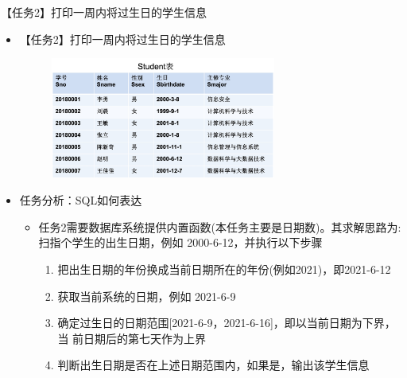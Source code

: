 \begin{frame}[allowframebreaks]{【任务2】打印一周内将过生日的学生信息}
\begin{itemize}
    \item 【任务2】打印一周内将过生日的学生信息
   \begin{figure}
        \centering
        \includegraphics[width=0.7\textwidth]{figure/fig-4.jpg}
    \end{figure}
\end{itemize}

\framebreak
\begin{itemize}
    \item 任务分析：SQL如何表达
\begin{itemize}
    \item 任务2需要数据库系统提供内置函数(本任务主要是日期数)。其求解思路为:扫指个学生的出生日期，例如 2000-6-12，并执行以下步骤
    \begin{enumerate}
\item 把出生日期的年份换成当前日期所在的年份(例如2021)，即2021-6-12
\item 获取当前系统的日期，例如 2021-6-9
\item 确定过生日的日期范围[2021-6-9，2021-6-16]，即以当前日期为下界，当	前日期后的第七天作为上界
\item 判断出生日期是否在上述日期范围内，如果是，输出该学生信息
    \end{enumerate}
\end{itemize}
\end{itemize}
    
\end{frame}

